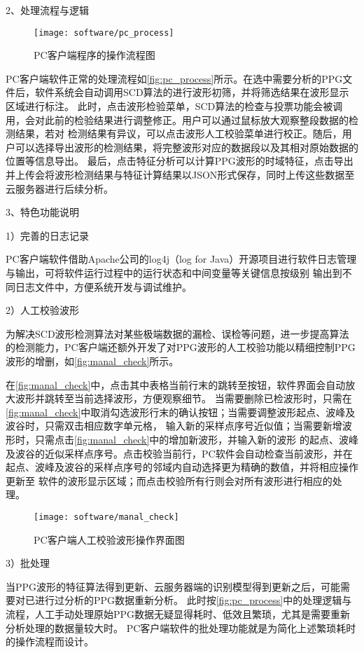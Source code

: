 2、处理流程与逻辑

\begin{figure}[htbp]
    \centering
    \texttt{[image: software/pc\_process]}
    \caption{\label{fig:pc_process}PC客户端程序的操作流程图}
\end{figure}

PC客户端软件正常的处理流程如\autoref{fig:pc_process}所示。在选中需要分析的PPG文件后，软件系统会自动调用SCD算法的进行波形初筛，并将筛选结果在波形显示区域进行标注。
此时，点击波形检验菜单，SCD算法的检查与投票功能会被调用，会对此前的检验结果进行调整修正。用户可以通过鼠标放大观察整段数据的检测结果，若对
检测结果有异议，可以点击波形人工校验菜单进行校正。随后，用户可以选择导出波形的检测结果，将完整波形对应的数据段以及其相对原始数据的位置等信息导出。
最后，点击特征分析可以计算PPG波形的时域特征，点击导出并上传会将波形检测结果与特征计算结果以JSON形式保存，同时上传这些数据至云服务器进行后续分析。

3、特色功能说明

1）完善的日志记录

PC客户端软件借助Apache公司的log4j（log for Java）开源项目\cite{log4j}进行软件日志管理与输出，可将软件运行过程中的运行状态和中间变量等关键信息按级别
输出到不同日志文件中，方便系统开发与调试维护。

2）人工校验波形

为解决SCD波形检测算法对某些极端数据的漏检、误检等问题，进一步提高算法的检测能力，PC客户端还额外开发了对PPG波形的人工校验功能以精细控制PPG波形的增删，如\autoref{fig:manal_check}所示。

在\autoref{fig:manal_check}中，点击其中表格当前行末的跳转至按钮，软件界面会自动放大波形并跳转至当前选择波形，方便观察细节。
当需要删除已检波形时，只需在\autoref{fig:manal_check}中取消勾选波形行末的确认按钮；当需要调整波形起点、波峰及波谷时，只需双击相应数字单元格，
输入新的采样点序号近似值；当需要新增波形时，只需点击\autoref{fig:manal_check}中的增加新波形，并输入新的波形
的起点、波峰及波谷的近似采样点序号。点击校验当前行，PC软件会自动检查当前波形，并在起点、波峰及波谷的采样点序号的邻域内自动选择更为精确的数值，并将相应操作更新至
软件的波形显示区域；而点击校验所有行则会对所有波形进行相应的处理。
\begin{figure}[htbp]
    \centering
    \texttt{[image: software/manal\_check]}
    \caption{\label{fig:manal_check}PC客户端人工校验波形操作界面图}
\end{figure}

3）批处理

当PPG波形的特征算法得到更新、云服务器端的识别模型得到更新之后，可能需要对已进行过分析的PPG数据重新分析。
此时按\autoref{fig:pc_process}中的处理逻辑与流程，人工手动处理原始PPG数据无疑显得耗时、低效且繁琐，尤其是需要重新分析处理的数据量较大时。
PC客户端软件的批处理功能就是为简化上述繁琐耗时的操作流程而设计。

